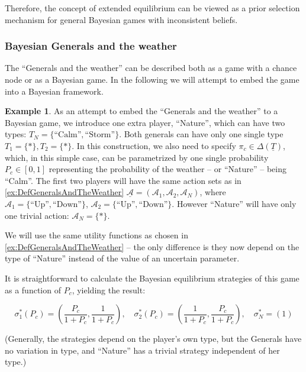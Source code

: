 \documentclass{article}
\theoremstyle{definition}
\newtheorem*{example}{Example}
\begin{document}
Therefore, the concept of extended equilibrium can be viewed as a prior selection mechanism for general Bayesian games with inconsistent beliefs.


\subsubsection{Bayesian Generals and the weather}

The ``Generals and the weather'' can be described both as a game with a chance node or as a Bayesian game. In the following we will attempt to embed the game into a Bayesian framework.

\begin{example}
As an attempt to embed the ``Generals and the weather'' to a Bayesian game, we introduce one extra player, ``Nature'', which can have two types: $T_N = \{ \text{``Calm''}, \text{``Storm''} \}$. Both generals can have only one single type $T_1 = \{*\}, T_2 = \{*\}$.
In this construction, we also need to specify $\pi_c \in \Delta(\underline{T})$, which, in this simple case, can be parametrized by one single probability $P_c \in [0,1]$ representing the probability of the weather -- or ``Nature'' -- being ``Calm''.
The first two players will have the same action sets as in \ref{ex:DefGeneralsAndTheWeather} $\underline{\mathcal{A}} = (\mathcal{A}_1,\mathcal{A}_2,\mathcal{A}_N)$, where $\mathcal{A}_1 = \{\text{``Up''},\text{``Down''}\}$, $\mathcal{A}_2 = \{\text{``Up''},\text{``Down''}\}$. 
However ``Nature'' will have only one trivial action: $\mathcal{A}_N = \{*\}$.

We will use the same utility functions as chosen in \ref{ex:DefGeneralsAndTheWeather} -- the only difference is they now depend on the type of ``Nature'' instead of the value of an uncertain parameter.

It is straightforward to calculate the Bayesian equilibrium strategies \cite{book:GameTheory} of this game as a function of $P_c$, yielding the result:

\begin{equation}
    \sigma^*_1(P_c) = \left(\frac{P_c}{1+P_c}, \frac{1}{1+P_c} \right ), \quad
    \sigma_2^*(P_c) = \left(\frac{1}{1+P_c}, \frac{P_c}{1+P_c} \right ), \quad
    \sigma^*_N=(1)
\end{equation}

(Generally, the strategies depend on the player's own type, but the Generals have no variation in type, and ``Nature'' has a trivial strategy independent of her type.)

\end{example}
\end{document}
